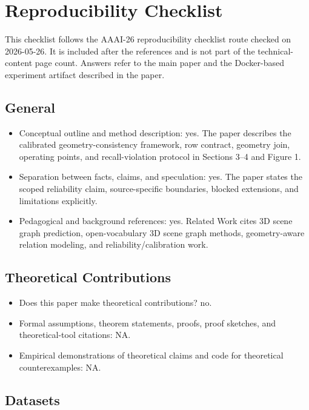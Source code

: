 \section*{Reproducibility Checklist}

This checklist follows the AAAI-26 reproducibility checklist route checked on
2026-05-26. It is included after the references and is not part of the
technical-content page count. Answers refer to the main paper and the
Docker-based experiment artifact described in the paper.

\subsection*{General}

\begin{itemize}
    \item Conceptual outline and method description: yes. The paper describes
    the calibrated geometry-consistency framework, row contract, geometry join,
    operating points, and recall-violation protocol in Sections 3--4 and
    Figure 1.
    \item Separation between facts, claims, and speculation: yes. The paper
    states the scoped reliability claim, source-specific boundaries, blocked
    extensions, and limitations explicitly.
    \item Pedagogical and background references: yes. Related Work cites 3D
    scene graph prediction, open-vocabulary 3D scene graph methods,
    geometry-aware relation modeling, and reliability/calibration work.
\end{itemize}

\subsection*{Theoretical Contributions}

\begin{itemize}
    \item Does this paper make theoretical contributions? no.
    \item Formal assumptions, theorem statements, proofs, proof sketches, and
    theoretical-tool citations: NA.
    \item Empirical demonstrations of theoretical claims and code for
    theoretical counterexamples: NA.
\end{itemize}

\subsection*{Datasets}

